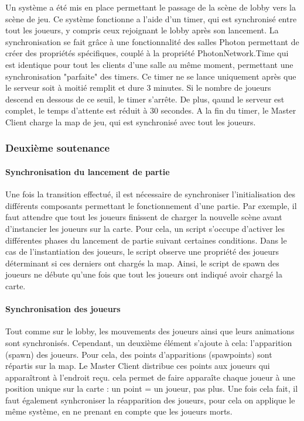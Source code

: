             Un système a été mis en place permettant le passage de la scène de lobby vers la scène de jeu.
            Ce système fonctionne a l'aide d'un timer, qui est synchronisé entre tout les joueurs, y compris ceux
            rejoignant le lobby après son lancement. La synchronisation se fait grâce à une fonctionnalité des salles Photon
            permettant de créer des propriétés spécifiques, couplé à la propriété PhotonNetwork.Time qui
            est identique pour tout les clients d'une salle au même moment, permettant une synchronisation
            "parfaite" des timers.
            Ce timer ne se lance uniquement après que le serveur soit à moitié remplit et dure 3 minutes. Si le nombre de joueurs descend en dessous de ce seuil, le timer s'arrête. De plus, qaund le serveur
            est complet, le temps d'attente est réduit à 30 secondes.
            A la fin du timer, le Master Client charge la map de jeu, qui est synchronisé avec tout les joueurs.



    \subsubsection{Deuxième soutenance}

        \paragraph{Synchronisation du lancement de partie}
        
            Une fois la transition effectué, il est nécessaire de synchroniser l'initialisation des différents composants
            permettant le fonctionnement d'une partie. Par exemple, il faut attendre que tout les joueurs finissent de charger
            la nouvelle scène avant d'instancier les joueurs sur la carte. Pour cela, un script s'occupe d'activer les différentes phases
            du lancement de partie suivant certaines conditions. Dans le cas de l'instantiation des joueurs, le script observe une propriété
            des joueurs déterminant si ces derniers ont chargés la map. Ainsi, le script de spawn des joueurs ne débute qu'une fois que tout les joueurs
            ont indiqué avoir chargé la carte.


        \paragraph{Synchronisation des joueurs}

            Tout comme sur le lobby, les mouvements des joueurs ainsi que leurs animations sont synchronisés. Cependant,
            un deuxième élément s'ajoute à cela: l'apparition (spawn) des joueurs. Pour cela, des points d'apparitions (spawpoints)
            sont répartis sur la map. Le Master Client distribue ces points aux joueurs qui apparaîtront à l'endroit reçu. cela permet
            de faire apparaîte chaque joueur à une position unique sur la carte : un point = un joueur, pas plus. Une fois cela fait,
            il faut également synhcroniser la réapparition des joueurs, pour cela on applique le même système, en ne prenant en compte que les joueurs
            morts.


